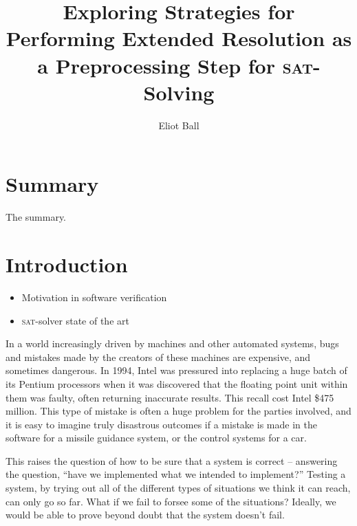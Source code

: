 \documentclass[11pt]{article}
\newcommand{\sat}{\textsc{sat}}
\begin{document}
\title{Exploring Strategies for Performing Extended Resolution as a Preprocessing Step for \sat-Solving}
\author{Eliot Ball}

\maketitle

\section*{Summary}

The summary.

\tableofcontents

\section{Introduction}

\begin{itemize}
  \item Motivation in software verification
  \item \sat{}-solver state of the art
\end{itemize}

In a world increasingly driven by machines and other automated systems, bugs and mistakes made by the creators of these machines are expensive, and sometimes dangerous. In 1994, Intel was pressured into replacing a huge batch of its Pentium processors when it was discovered that the floating point unit within them was faulty, often returning inaccurate results. This recall cost Intel \$475 million. This type of mistake is often a huge problem for the parties involved, and it is easy to imagine truly disastrous outcomes if a mistake is made in the software for a missile guidance system, or the control systems for a car.

This raises the question of how to be sure that a system is correct -- answering the question, ``have we implemented what we intended to implement?'' Testing a system, by trying out all of the different types of situations we think it can reach, can only go so far. What if we fail to forsee some of the situations? Ideally, we would be able to prove beyond doubt that the system doesn't fail.
\end{document}
